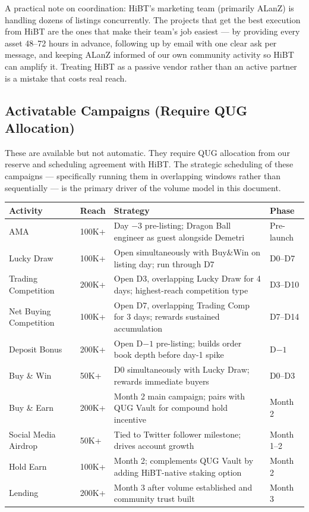 \documentclass[11pt,a4paper]{article}
\begin{document}
A practical note on coordination: HiBT's marketing team (primarily ALanZ) is handling dozens of listings concurrently. The projects that get the best execution from HiBT are the ones that make their team's job easiest — by providing every asset 48--72 hours in advance, following up by email with one clear ask per message, and keeping ALanZ informed of our own community activity so HiBT can amplify it. Treating HiBT as a passive vendor rather than an active partner is a mistake that costs real reach.

\subsection{Activatable Campaigns (Require QUG Allocation)}

These are available but not automatic. They require QUG allocation from our reserve and scheduling agreement with HiBT. The strategic scheduling of these campaigns — specifically running them in overlapping windows rather than sequentially — is the primary driver of the volume model in this document.

\begin{center}
\begin{tabular}{L{3.2cm} C{1.8cm} L{5cm} L{2.5cm}}
  \toprule
  \textbf{Activity} & \textbf{Reach} & \textbf{Strategy} & \textbf{Phase} \\
  \midrule
  AMA & 100K+ & Day $-3$ pre-listing; Dragon Ball engineer as guest alongside Demetri & Pre-launch \\
  Lucky Draw & 100K+ & Open simultaneously with Buy\&Win on listing day; run through D7 & D0--D7 \\
  Trading Competition & 200K+ & Open D3, overlapping Lucky Draw for 4 days; highest-reach competition type & D3--D10 \\
  Net Buying Competition & 100K+ & Open D7, overlapping Trading Comp for 3 days; rewards sustained accumulation & D7--D14 \\
  Deposit Bonus & 200K+ & Open D$-1$ pre-listing; builds order book depth before day-1 spike & D$-1$ \\
  Buy \& Win & 50K+ & D0 simultaneously with Lucky Draw; rewards immediate buyers & D0--D3 \\
  Buy \& Earn & 200K+ & Month 2 main campaign; pairs with QUG Vault for compound hold incentive & Month 2 \\
  Social Media Airdrop & 50K+ & Tied to Twitter follower milestone; drives account growth & Month 1--2 \\
  Hold Earn & 100K+ & Month 2; complements QUG Vault by adding HiBT-native staking option & Month 2 \\
  Lending & 200K+ & Month 3 after volume established and community trust built & Month 3 \\
  \bottomrule
\end{tabular}
\end{center}
\end{document}
